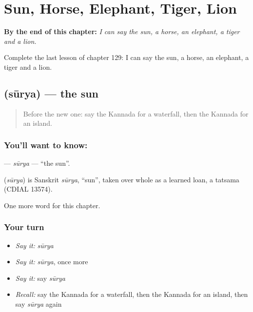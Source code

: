 
\chapter{Sun, Horse, Elephant, Tiger, Lion}
\label{ch:ka-sun-horse-elephant-tiger-lion}

\begin{chapteropening}
\textbf{By the end of this chapter:} \emph{I can say the sun, a horse, an elephant, a tiger and a lion.}

Complete the last lesson of chapter 129: I can say the sun, a horse, an elephant, a tiger and a lion.
\end{chapteropening}

\section[\texorpdfstring{\kn{ಸೂರ್ಯ} (sūrya)}{ಸೂರ್ಯ (sūrya)}]{ (sūrya) — the sun}

\label{lesson:KA-C129-surya}



\begin{quote}
Before the new one: say the Kannada for a waterfall, then the Kannada for an island.
\end{quote}

\subsection*{You'll want to know: }
\textbf{} — \emph{sūrya} — \textquotedblleft{}the sun\textquotedblright{}.

\begin{cousinweb}
\textbf{} (\emph{sūrya}) is Sanskrit \emph{sūrya}, \textquotedblleft{}sun\textquotedblright{}, taken over whole as a learned loan, a tatsama (CDIAL 13574).
\end{cousinweb}

\begin{grammarlens}[title={What you've built}]
One more word for this chapter.
\end{grammarlens}

\subsection*{Your turn}
\begin{itemize}
\raggedright
  \item \emph{Say it:} \emph{sūrya}
  \item \emph{Say it:} \emph{sūrya}, once more
  \item \emph{Say it:} say \emph{sūrya}
  \item \emph{Recall:} say the Kannada for a waterfall, then the Kannada for an island, then say \emph{sūrya} again
\end{itemize}

